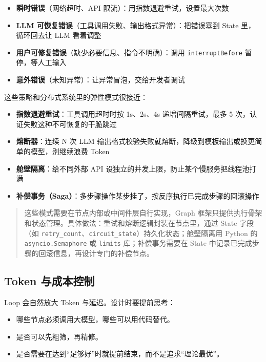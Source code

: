 \documentclass[9pt,a4paper,twocolumn]{ctexart}
\begin{document}
\begin{itemize}[itemsep=1pt, topsep=2pt]
  \item \textbf{瞬时错误}（网络超时、API 限流）：用指数退避重试，设置最大次数
  \item \textbf{LLM 可恢复错误}（工具调用失败、输出格式异常）：把错误塞到 State 里，循环回去让 LLM 看着调整
  \item \textbf{用户可修复错误}（缺少必要信息、指令不明确）：调用 \texttt{interruptBefore} 暂停，等人工输入
  \item \textbf{意外错误}（未知异常）：让异常冒泡，交给开发者调试
\end{itemize}


这些策略和分布式系统里的弹性模式很接近：


\begin{itemize}[itemsep=1pt, topsep=2pt]
  \item \textbf{指数退避重试}：工具调用超时时按 1s、2s、4s 递增间隔重试，最多 5 次，认证失败这种不可恢复的干脆跳过
  \item \textbf{熔断器}：连续 N 次 LLM 输出格式校验失败就熔断，降级到模板输出或换更简单的模型，别继续浪费 Token
  \item \textbf{舱壁隔离}：给不同外部 API 设独立的并发上限，防止某个慢服务把线程池打满
  \item \textbf{补偿事务（Saga）}：多步骤操作某步挂了，按反序执行已完成步骤的回滚操作
\end{itemize}


\begin{quote}
这些模式需要在节点内部或中间件层自行实现，Graph 框架只提供执行骨架和状态管理。具体做法：重试和熔断逻辑封装在节点里，通过 State 字段（如 \texttt{retry\_count}、\texttt{circuit\_state}）持久化状态；舱壁隔离用 Python 的 \texttt{asyncio.Semaphore} 或 \texttt{limits} 库；补偿事务需要在 State 中记录已完成步骤的回滚信息，再设计专门的补偿节点。
\end{quote}



\subsection*{Token 与成本控制}


Loop 会自然放大 Token 与延迟。设计时要提前思考：


\begin{itemize}[itemsep=1pt, topsep=2pt]
  \item 哪些节点必须调用大模型，哪些可以用代码替代。
  \item 是否可以先粗筛，再精修。
  \item 是否需要在达到“足够好”时就提前结束，而不是追求“理论最优”。
\end{itemize}
\end{document}
